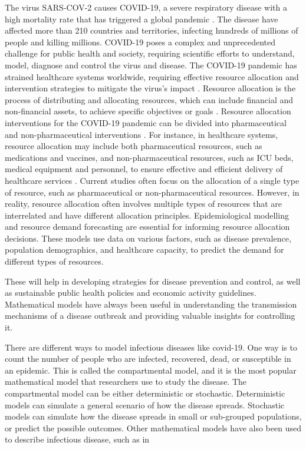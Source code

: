 \documentclass[12pt]{article}
\begin{document}
The virus SARS-COV-2 causes COVID-19, a severe respiratory disease with a high mortality rate that has triggered a global pandemic \cite{forman202012}. The disease have affected more than 210 countries and territories, infecting hundreds of millions of people and killing millions. COVID-19 poses a complex and unprecedented challenge for public health and society, requiring scientific efforts to understand, model, diagnose and control the virus and disease. The COVID-19 pandemic has strained healthcare systems worldwide, requiring effective resource allocation and intervention strategies to mitigate the virus's impact \cite{emanuel2020fair}. Resource allocation is the process of distributing and allocating resources, which can include financial and non-financial assets, to achieve specific objectives or goals \cite{jiang2019emergency}. Resource allocation interventions for the COVID-19 pandemic can be divided into pharmaceutical and non-pharmaceutical interventions \cite{ehmann2021operational}. For instance, in healthcare systems, resource allocation may include both pharmaceutical resources, such as medications and vaccines, and non-pharmaceutical resources, such as ICU beds, medical equipment and personnel, to ensure effective and efficient delivery of healthcare services \cite{zaric2001resource, brandeau2004allocating}. Current studies often focus on the allocation of a single type of resource, such as pharmaceutical or non-pharmaceutical resources. However, in reality, resource allocation often involves multiple types of resources that are interrelated and have different allocation principles. Epidemiological modelling and resource demand forecasting are essential for informing resource allocation decisions. These models use data on various factors, such as disease prevalence, population demographics, and healthcare capacity, to predict the demand for different types of resources.

These will help in developing strategies for disease prevention and control, as well as sustainable public health policies and economic activity guidelines. Mathematical models have always been useful in understanding the transmission mechanisms of a disease outbreak and providing valuable insights for controlling it. 

There are different ways to model infectious diseases like covid-19. One way is to count the number of people who are infected, recovered, dead, or susceptible in an epidemic. This is called the compartmental model, and it is the most popular mathematical model that researchers use to study the disease. The compartmental model can be either deterministic or stochastic. Deterministic models can simulate a general scenario of how the disease spreads. Stochastic models can simulate how the disease spreads in small or sub-grouped populations, or predict the possible outcomes. Other mathematical models have also been used to describe infectious disease, such as in
\end{document}
